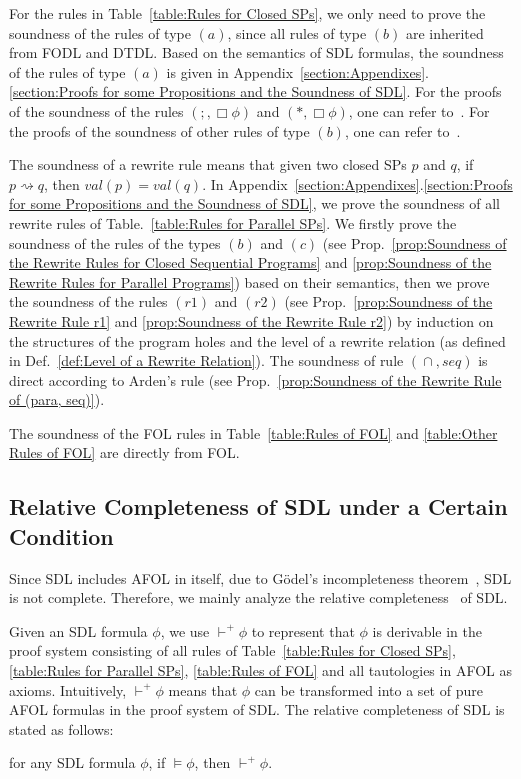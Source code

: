 \documentclass{fcs}
\newcommand{\val}[0]{\mathit{val}}
\DeclareMathOperator{\seq}{;}
\DeclareMathOperator{\para}{\cap}
\newcommand{\red}[0]{\rightsquigarrow}
\newcommand{\reld}[0]{\mathit{\vdash^+}}
\begin{document}
For the rules in Table~\ref{table:Rules for Closed SPs}, we only need to prove the soundness of the rules of type $(a)$, since all rules of type $(b)$ are inherited from FODL and DTDL.
Based on the semantics of SDL formulas, the soundness of the rules of type $(a)$ is given in Appendix~\ref{section:Appendixes}.\ref{section:Proofs for some Propositions and the Soundness of SDL}.
For the proofs of the soundness of the rules $(\seq, \Box\phi)$ and $(*, \Box\phi)$, one can refer to~\cite{Platzer07}.
For the proofs of the soundness of other rules of type $(b)$, one can refer to~\cite{Harel00}.

The soundness of a rewrite rule means that given two closed SPs $p$ and $q$, if $p\red q$, then $\val(p) = \val(q)$.
In Appendix~\ref{section:Appendixes}.\ref{section:Proofs for some Propositions and the Soundness of SDL}, we prove the soundness of all rewrite rules of Table.~\ref{table:Rules for Parallel SPs}.
We firstly prove the soundness of the rules of the types $(b)$ and $(c)$ (see Prop.~\ref{prop:Soundness of the Rewrite Rules for Closed Sequential Programs} and \ref{prop:Soundness of the Rewrite Rules for Parallel Programs}) based on their semantics,
then we prove the soundness of the rules $(\mathit{r1})$ and $(\mathit{r2})$ (see Prop.~\ref{prop:Soundness of the Rewrite Rule r1} and \ref{prop:Soundness of the Rewrite Rule r2}) by induction on the structures of the program holes and the level of a rewrite relation (as defined in Def.~\ref{def:Level of a Rewrite Relation}).
The soundness of rule $(\para, \mathit{seq})$ is direct according to Arden's rule (see Prop.~\ref{prop:Soundness of the Rewrite Rule of (para, seq)}).

The soundness of the FOL rules in Table~\ref{table:Rules of FOL} and \ref{table:Other Rules of FOL} are directly from FOL.


\subsection{Relative Completeness of SDL under a Certain Condition}
\label{section:Relative Completeness of SDL under a Certain Condition}
Since SDL includes AFOL in itself, due to G\"odel's incompleteness theorem~\cite{Godel31}, SDL is not complete.
Therefore, we mainly analyze the relative completeness~\cite{Cook78} of SDL.

Given an SDL formula $\phi$, we use $\reld \phi$ to represent that $\phi$ is derivable in the proof system consisting of all rules of Table~\ref{table:Rules for Closed SPs}, \ref{table:Rules for Parallel SPs}, \ref{table:Rules of FOL} and
all tautologies in AFOL as axioms. Intuitively, $\reld \phi$ means that $\phi$ can be transformed into a set of pure AFOL formulas in the proof system of SDL.
The relative completeness of SDL is stated as follows:
\begin{center}
for any SDL formula $\phi$, if $\models \phi$, then $\reld\phi$.
\end{center}
\end{document}

